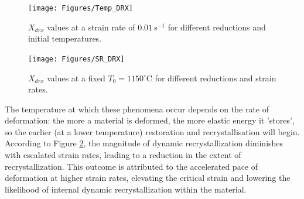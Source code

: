 \documentclass[metals,article,submit,pdftex,moreauthors]{Definitions/mdpi}
\begin{document}
\begin{figure}[H]
\texttt{[image: Figures/Temp\_DRX]}
\caption{$X_{drx}$ values at a strain rate of $0.01~\text{s}^{-1}$ for different reductions and initial temperatures.}
\label{fig:TempEffect}
\end{figure}
\begin{figure}[H]
\texttt{[image: Figures/SR\_DRX]}
\caption{$X_{drx}$ values at a fixed $T_0=1150^\circ$C for different reductions and strain rates.}
\label{fig:SREffect}
\end{figure}

The temperature at which these phenomena occur depends on the rate of deformation: the more a material is deformed, the more elastic energy it 'stores', so the earlier (at a lower temperature) restoration and recrystallisation will begin.
According to Figure \ref{fig:SREffect}, the magnitude of dynamic recrystallization diminishes with escalated strain rates, leading to a reduction in the extent of recrystallization.
This outcome is attributed to the accelerated pace of deformation at higher strain rates, elevating the critical strain and lowering the likelihood of internal dynamic recrystallization within the material.

\end{document}
